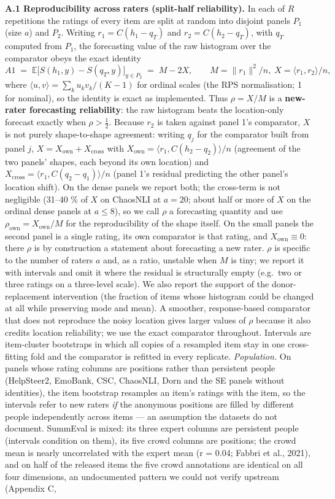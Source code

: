 \documentclass{article}
\begin{document}
\textbf{A.1 Reproducibility across raters (split-half reliability).} In each of \(R\) repetitions the ratings of every item are split at random into disjoint panels \(P_1\) (size \(a\)) and \(P_2\). Writing \(r_1 = C(h_1-q_T)\) and \(r_2 = C(h_2-q_T)\), with \(q_T\) computed from \(P_1\), the forecasting value of the raw histogram over the comparator obeys the exact identity \[A1 \;=\; \mathbb E\big[S(h_1,y)-S(q_T,y)\big]_{y\in P_2} \;=\; M - 2X,\qquad M=\|r_1\|^2/n,\; X=\langle r_1,r_2\rangle/n,\] where \(\langle u,v\rangle=\sum_k u_k v_k/(K-1)\) for ordinal scales (the RPS normalisation; 1 for nominal), so the identity is exact as implemented. Thus \(\rho = X/M\) is a \textbf{new-rater forecasting reliability}: the raw histogram beats the location-only forecast exactly when \(\rho>\tfrac12\). Because \(r_2\) is taken against panel 1's comparator, \(X\) is not purely shape-to-shape agreement: writing \(q_j\) for the comparator built from panel \(j\), \(X = X_{\text{own}} + X_{\text{cross}}\) with \(X_{\text{own}}=\langle r_1, C(h_2-q_2)\rangle/n\) (agreement of the two panels' shapes, each beyond its own location) and \(X_{\text{cross}}=\langle r_1, C(q_2-q_1)\rangle/n\) (panel 1's residual predicting the other panel's location shift). On the dense panels we report both; the cross-term is not negligible (31--40 \% of \(X\) on ChaosNLI at \(a=20\); about half or more of \(X\) on the ordinal dense panels at \(a\le 8\)), so we call \(\rho\) a forecasting quantity and use \(\rho_{\text{own}}=X_{\text{own}}/M\) for the reproducibility of the shape itself. On the small panels the second panel is a single rating, its own comparator is that rating, and \(X_{\text{own}}\equiv 0\): there \(\rho\) is by construction a statement about forecasting a new rater. \(\rho\) is specific to the number of raters \(a\) and, as a ratio, unstable when \(M\) is tiny; we report it with intervals and omit it where the residual is structurally empty (e.g.~two or three ratings on a three-level scale). We also report the support of the donor-replacement intervention (the fraction of items whose histogram could be changed at all while preserving mode and mean). A smoother, response-based comparator that does not reproduce the noisy location gives larger values of \(\rho\) because it also credits location reliability; we use the exact comparator throughout. Intervals are item-cluster bootstraps in which all copies of a resampled item stay in one cross-fitting fold and the comparator is refitted in every replicate. \emph{Population.} On panels whose rating columns are positions rather than persistent people (HelpSteer2, EmoBank, CSC, ChaosNLI, Dorn and the SE panels without identities), the item bootstrap resamples an item's ratings with the item, so the intervals refer to new raters \emph{if} the anonymous positions are filled by different people independently across items --- an assumption the datasets do not document. SummEval is mixed: its three expert columns are persistent people (intervals condition on them), its five crowd columns are positions; the crowd mean is nearly uncorrelated with the expert mean (r = 0.04; Fabbri et al., 2021), and on half of the released items the five crowd annotations are identical on all four dimensions, an undocumented pattern we could not verify upstream (Appendix C, 
\end{document}
